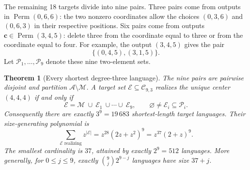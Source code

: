 \documentclass[11pt,letterpaper]{article}
\newtheorem{theorem}{Theorem}[section]
\theoremstyle{definition}\newtheorem{definition}[theorem]{Definition}
\theoremstyle{remark}\newtheorem{remark}[theorem]{Remark}
\theoremstyle{definition}\newtheorem{question}[theorem]{Question}
\newcommand{\bpC}[2]{\mathcal C_{#1,#2}}
\newcommand{\bpE}{\mathcal E}
\begin{document}
The remaining 18 targets divide into nine pairs. Three pairs come from
outputs in $\operatorname{Perm}(0,6,6)$: the two nonzero coordinates allow
the choices $(0,3,6)$ and $(0,6,3)$ in their respective positions. Six pairs
come from outputs $\mathbf c\in\operatorname{Perm}(3,4,5)$: delete three from
the coordinate equal to three or from the coordinate equal to four. For
example, the output $(3,4,5)$ gives the pair
\begin{equation}\label{ids:si:eq:samplepair}
 \{(0,4,5),(3,1,5)\}.
\end{equation}
Let $\mathcal P_1,\ldots,\mathcal P_9$ denote these nine two-element sets.

\begin{theorem}[Every shortest degree-three language]\label{ids:si:thm:degree3}
The nine pairs are pairwise disjoint and partition
$\mathcal A\setminus\mathcal M$. A target set $\bpE\subseteq\bpC{9}{3}$
realizes the unique center $(4,4,4)$ if and only if
\begin{equation}\label{ids:si:eq:degree3languages}
 \bpE=\mathcal M\ \cup\ \bpE_1\ \cup\cdots\cup\ \bpE_9,
 \qquad \varnothing\ne \bpE_i\subseteq\mathcal P_i.
\end{equation}
Consequently there are exactly $3^9=19\,683$ shortest-length target
languages. Their size-generating polynomial is
\begin{equation}\label{ids:si:eq:languagepoly}
 \sum_{\bpE\text{ realizing}} z^{|\bpE|}
     =z^{28}(2z+z^2)^9=z^{37}(2+z)^9.
\end{equation}
The smallest cardinality is $37$, attained by exactly $2^9=512$ languages.
More generally, for $0\leq j\leq9$, exactly
$\binom9j2^{9-j}$ languages have size $37+j$.
\end{theorem}
\end{document}
